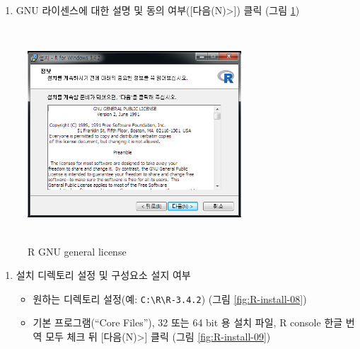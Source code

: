 \documentclass[11pt,a4paper]{book}
\providecommand{\tightlist}{%
  \setlength{\itemsep}{0pt}\setlength{\parskip}{0pt}}
\theoremstyle{definition}
\theoremstyle{definition}
\theoremstyle{definition}
\theoremstyle{remark}
\begin{document}
\begin{enumerate}
\def\labelenumi{\arabic{enumi}.}
\setcounter{enumi}{8}
\tightlist
\item
  GNU 라이센스에 대한 설명 및 동의 여부({[}다음(N)\textgreater{}{]})
  클릭 (그림 \ref{fig:R-install-07})
\end{enumerate}

\begin{figure}[H]
{
  \centering
  \includegraphics[width = 8cm, height = 8cm]{Figures/R-install-F02.png}
  \caption[R GNU general license]{R GNU general license}\label{fig:R-install-07}
}
\end{figure}

\begin{enumerate}
\def\labelenumi{\arabic{enumi}.}
\setcounter{enumi}{9}
\tightlist
\item
  설치 디렉토리 설정 및 구성요소 설지 여부

  \begin{itemize}
  \tightlist
  \item
    원하는 디렉토리 설정(예:
    \texttt{C:\textbackslash{}R\textbackslash{}R-3.4.2}) (그림
    \ref{fig:R-install-08})
  \item
    기본 프로그램(``Core Files''), 32 또는 64 bit 용 설치 파일, R
    console 한글 번역 모두 체크 뒤 {[}다음(N)\textgreater{}{]} 클릭
    (그림 \ref{fig:R-install-09})
  \end{itemize}
\end{enumerate}
\end{document}
